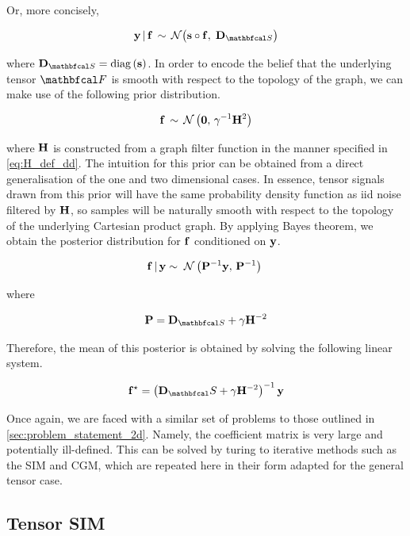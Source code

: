 Or, more concisely, 

\begin{equation}
    \y \, | \, \f \, \sim \, \mathcal{N}\big(\s \circ \f, \; \D_{\St} \big)
\end{equation}

where $\D_{\St} = \diag{\s}$. In order to encode the belief that the underlying tensor $\Ft$ is smooth with respect to the topology of the graph, we can make use of the following prior distribution. 

\begin{equation}
    \mathbf{f} \, \sim \, \mathcal{N}\left( \mathbf{0}, \, \gamma^{-1} \mathbf{H}^2 \right) 
\end{equation}

where $\mathbf{H}$ is constructed from a graph filter function in the manner specified in \cref{eq:H_def_dd}. The intuition for this prior can be obtained from a direct generalisation of the one and two dimensional cases. In essence, tensor signals drawn from this prior will have the same probability density function as iid noise filtered by $\mathbf{H}$, so samples will be naturally smooth with respect to the topology of the underlying Cartesian product graph. By applying Bayes theorem, we obtain the posterior distribution for $\mathbf{f}$ conditioned on $\mathbf{y}$. 


\begin{equation}
    \mathbf{f} \, | \, \mathbf{y} \sim \; \mathcal{N}\left(\mathbf{P}^{-1} \mathbf{y}, \, \mathbf{P}^{-1}\right) \;
\end{equation}

where 

\begin{equation}
    \PP = \D_{\St} + \gamma \HH^{-2}
\end{equation}

Therefore, the mean of this posterior is obtained by solving the following linear system.

\begin{equation}
    \label{eq:lin_system_dd}
    \f^{\star} = \left(\D_\St + \gamma \HH^{-2}\right)^{-1} \y
\end{equation}

Once again, we are faced with a similar set of problems to those outlined in \cref{sec:problem_statement_2d}. Namely, the coefficient matrix is very large and potentially ill-defined. This can be solved by turing to iterative methods such as the SIM and CGM, which are repeated here in their form adapted for the general tensor case. 

\subsection{Tensor SIM}

